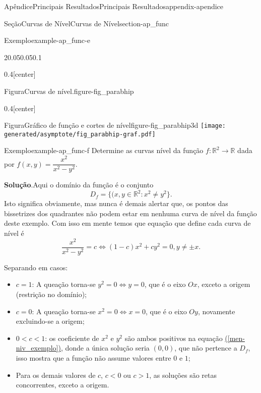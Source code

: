 \documentclass[oneside,10pt,]{book}
\newcommand{\blocktitlefont}{\relax}
\newcommand{\xreffont}{\relax}
\numberwithin{equation}{section}
\newcommand{\R}{\mathbb R}
\begin{document}
\begin{appendixptx}{Apêndice}{Principais Resultados}{}{Principais Resultados}{}{}{appendix-apendice}
\begin{sectionptx}{Seção}{Curvas de Nível}{}{Curvas de Nível}{}{}{section-ap_func}
\begin{example}{Exemplo}{}{example-ap_func-e}
\begin{sidebyside}{2}{0.05}{0.05}{0.1}
\begin{sbspanel}{0.4}[center]
\begin{panelfigureptx}{Figura}{Curvas de nível.}{figure-fig_parabhip}{}
{}%
\tcblower
\end{panelfigureptx}%
\end{sbspanel}%
\begin{sbspanel}{0.4}[center]%
\begin{panelfigureptx}{Figura}{Gráfico de função e cortes de nível}{figure-fig_parabhip3d}{}%
\texttt{[image: generated/asymptote/fig\_parabhip-graf.pdf]}
\tcblower
\end{panelfigureptx}%
\end{sbspanel}%
\end{sidebyside}%
%
\end{example}
\begin{example}{Exemplo}{}{example-ap_func-f}%
Determine as curvas nível da função \(f\colon\R^2\to\R\) dada por \(f(x,y)=\dfrac{x^2}{x^2-y^2}\).%
\par\smallskip%
\noindent\textbf{\blocktitlefont Solução}.\hypertarget{solution-ap_func-f-b}{}\quad{}Aqui o domínio da função é o conjunto%
\begin{equation*}
D_f=\big\{(x,y\in\R^2\colon x^2\neq y^2\big\}.
\end{equation*}
Isto significa obviamente, mas nunca é demais alertar que, os pontos das bissetrizes dos quadrantes não podem estar em nenhuma curva de nível da função deste exemplo. Com isso em mente temos que equação que define cada curva de nível é%
\begin{equation}
\dfrac{x^2}{x^2-y^2}=c \iff (1-c)x^2+cy^2=0, y\neq\pm x.\label{men-niv_exemplo}
\end{equation}
%
\par
Separando em casos:%
\begin{itemize}[label=\textbullet]
\item{}\(c=1\): A queação torna-se \(y^2=0\iff y=0\), que é o eixo \(Ox\), exceto a origem (restrição no domínio);%
\item{}\(c=0\): A queação torna-se \(x^2=0\iff x=0\), que é o eixo \(Oy\), novamente excluindo-se a origem;%
\item{}\(0<c<1\): os coeficiente de \(x^2\) e \(y^2\) são ambos positivos na equação \hyperref[men-niv_exemplo]{({\xreffont\ref{men-niv_exemplo}})}, donde a única solução seria \((0,0)\), que não pertence a \(D_f\), isso mostra que a função não assume valores entre \(0\) e \(1\);%
\item{}Para os demais valores de \(c\), \(c< 0\) ou \(c>1\), as soluções são retas concorrentes, exceto a origem.%
\end{itemize}
%
\par

\end{example}
\end{sectionptx}
\end{appendixptx}
\end{document}
